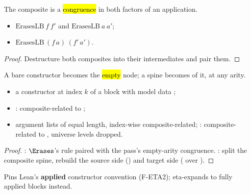 \begin{lemma}[Application]
\label{lem:ErasesLB-app}
\leanok
{}
 The composite is a \hl{congruence} in both factors of an application.
\begin{itemize}
\item {} $\mathrm{ErasesLB}\ f\ f'$ and $\mathrm{ErasesLB}\ a\ a'$;
\item {} $\mathrm{ErasesLB}\ (f\,a)\ (f'\,a')$.
\end{itemize}
\end{lemma}
\begin{proof}
\leanok
{}
 Destructure both composites into their intermediates and pair them.
\end{proof}

\begin{lemma}
\label{lem:ErasesLB-ctor}
\leanok
{}
 A bare constructor becomes the \hl{empty} node; a spine becomes  of it, at
any arity.
\begin{itemize}
\item {} a constructor at index $k$ of a block with model data ;
\item {} : composite-related to ;
\item {} argument lists of equal length, index-wise composite-related; 
: composite-related to , universe levels
dropped.
\end{itemize}
\end{lemma}
\begin{proof}
\leanok
{}
 : $\Erases$'s  rule paired with the pass's empty-arity
 congruence. : split the composite spine, rebuild the source side
() and target side ( over ).
\end{proof}

\begin{remark}
 Pins Lean's \textbf{applied} constructor convention (F-ETA2); 
eta-expands to fully applied blocks instead.
\end{remark}

